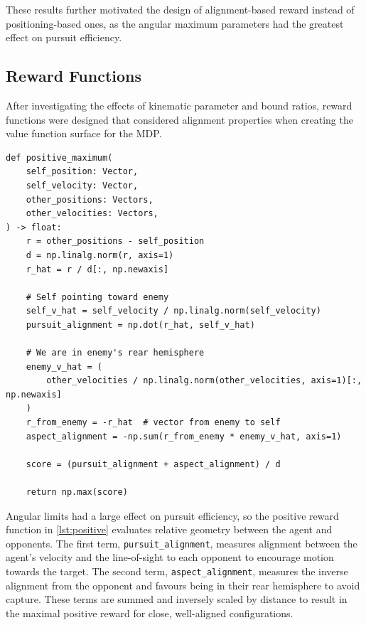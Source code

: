 These results further motivated the design of alignment-based reward instead of positioning-based ones, as the angular maximum parameters had the greatest effect on pursuit efficiency.

\subsection{Reward Functions}
\label{sec:3.3.3}

After investigating the effects of kinematic parameter and bound ratios, reward functions were designed that considered alignment properties when creating the value function surface for the MDP. 

\begin{listing}[H]
\begin{verbatim}
def positive_maximum(
    self_position: Vector,
    self_velocity: Vector,
    other_positions: Vectors,
    other_velocities: Vectors,
) -> float:
    r = other_positions - self_position
    d = np.linalg.norm(r, axis=1)
    r_hat = r / d[:, np.newaxis]

    # Self pointing toward enemy
    self_v_hat = self_velocity / np.linalg.norm(self_velocity)
    pursuit_alignment = np.dot(r_hat, self_v_hat)

    # We are in enemy's rear hemisphere
    enemy_v_hat = (
        other_velocities / np.linalg.norm(other_velocities, axis=1)[:, np.newaxis]
    )
    r_from_enemy = -r_hat  # vector from enemy to self
    aspect_alignment = -np.sum(r_from_enemy * enemy_v_hat, axis=1)

    score = (pursuit_alignment + aspect_alignment) / d

    return np.max(score)
\end{verbatim}
\caption{Positive reward function.}
\label{lst:positive}
\end{listing}

Angular limits had a large effect on pursuit efficiency, so the positive reward function in \cref{lst:positive} evaluates relative geometry between the agent and opponents. The first term, \texttt{pursuit\_alignment}, measures alignment between the agent's velocity and the line-of-sight to each opponent to encourage motion towards the target. The second term, \texttt{aspect\_alignment}, measures the inverse alignment from the opponent and favours being in their rear hemisphere to avoid capture.
These terms are summed and inversely scaled by distance to result in the maximal positive reward for close, well-aligned configurations.

